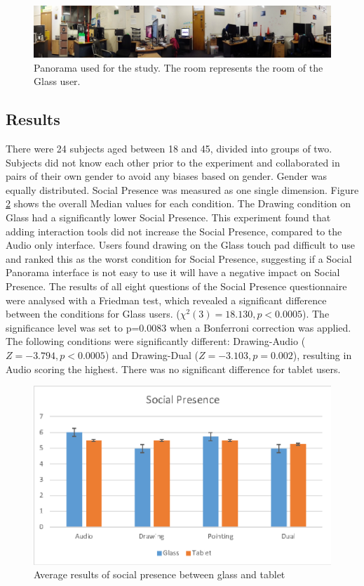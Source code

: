 \begin{figure}
    \centering
    \includegraphics[width=\linewidth]{images/63-pano-ismar14/envrionment-setup}
    \caption{Panorama used for the study. The room represents the room of the Glass user.}
    \label{fig:ismar14:envrionment-setup}
\end{figure}

\subsection{Results}

There were 24 subjects aged between 18 and 45, divided into groups of two. Subjects did not know each other prior to the experiment and collaborated in pairs of their own gender to avoid any biases based on gender. Gender was equally distributed. Social Presence was measured as one single dimension. Figure \ref{fig:ismar14:social-presence} shows the overall Median values for each condition. The Drawing condition on Glass had a significantly lower Social Presence. 
This experiment found that adding interaction tools did not increase the Social Presence, compared to the Audio only interface. Users found drawing on the Glass touch pad difficult to use and ranked this as the worst condition for Social Presence, suggesting if a Social Panorama interface is not easy to use it will have a negative impact on Social Presence. 
The results of all eight questions of the Social Presence questionnaire were analysed with a Friedman test, which revealed a significant difference between the conditions for Glass users. ($\chi^2(3)=18.130, p<0.0005$). The significance level was set to p=0.0083 when a Bonferroni correction was applied. The following conditions were significantly different: Drawing-Audio ($Z=-3.794, p<0.0005$) and Drawing-Dual ($Z=-3.103, p=0.002$), resulting in Audio scoring the highest. There was no significant difference for tablet users.

\begin{figure}
    \centering
    \includegraphics[width=.8\linewidth]{images/63-pano-ismar14/images-02.eps}
    \caption{Average results of social presence between glass and tablet}
    \label{fig:ismar14:social-presence}
\end{figure}

